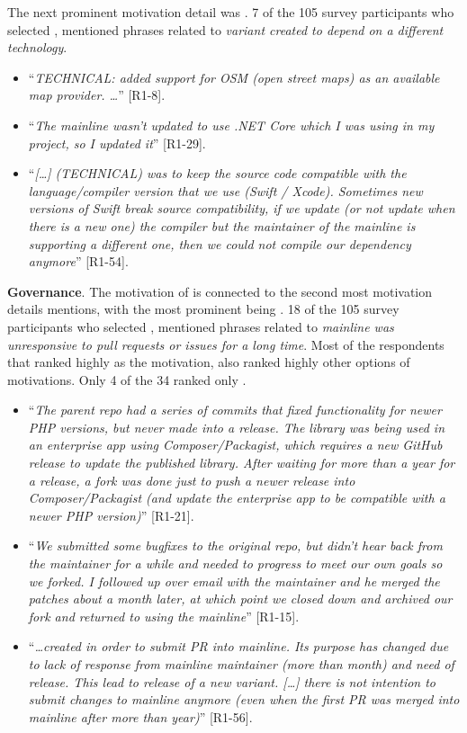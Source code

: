 \nd The next prominent  motivation detail was .
7 of the 105 survey participants who selected , mentioned phrases related to \emph{variant created to depend on a different technology}.

\begin{itemize}[leftmargin=*]
\item ``\emph{TECHNICAL: added support for OSM (open street maps) as an available map provider. \ldots}'' [R1-8].
\item ``\emph{The mainline wasn't updated to use .NET Core which I was using in my project, so I updated it}'' [R1-29].
\item ``\emph{[\dots] (TECHNICAL) was to keep the source code compatible with the language/compiler version that we use (Swift / Xcode). Sometimes new versions of Swift break source compatibility, if we update (or not update when there is a new one) the compiler but the maintainer of the mainline is supporting a different one, then we could not compile our dependency anymore}'' [R1-54].
\end{itemize}

\nd \textbf{Governance}. The motivation of  is connected to the second most motivation details mentions, with the most prominent being . 18 of the 105 survey participants who selected , mentioned phrases related to \emph{mainline was unresponsive to pull requests or issues for a long time}. Most of the respondents that ranked highly  as the motivation, also ranked highly other options of motivations. Only 4 of the 34 ranked only . 

\begin{itemize}[leftmargin=*]
\item ``\emph{The parent repo had a series of commits that fixed functionality for newer PHP versions, but never made into a release. The library was being used in an enterprise app using Composer/Packagist, which requires a new GitHub release to update the published library. After waiting for more than a year for a release, a fork was done just to push a newer release into Composer/Packagist (and update the enterprise app to be compatible with a newer PHP version)}'' [R1-21].

\item ``\emph{We submitted some bugfixes to the original repo, but didn't hear back from the maintainer for a while and needed to progress to meet our own goals so we forked. I followed up over email with the maintainer and he merged the patches about a month later, at which point we closed down and archived our fork and returned to using the mainline}'' [R1-15].

\item ``\emph{\ldots created in order to submit PR into mainline. Its purpose has changed due to lack of response from mainline maintainer (more than month) and need of release. This lead to release of a new variant. [\ldots] there is not intention to submit changes to mainline anymore (even when the first PR was merged into mainline after more than year)}'' [R1-56].
\end{itemize}

